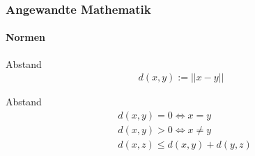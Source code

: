 \documentclass{beamer}
\begin{document}
\begin{frame}
    \frametitle{Angewandte Mathematik}
\framesubtitle{Normen}
 \begin{block}{Abstand}
\begin{align*}
d(x,y) := ||x-y||
\end{align*}
\end{block}
 \begin{block}{Abstand}
\begin{align*}
& d(x,y)  = 0 \Leftrightarrow x = y \\
& d(x,y)  > 0 \Leftrightarrow x \neq y \\
& d(x,z)  \leq  d(x,y) + d(y,z) 
\end{align*}
\end{block}
 \end{frame}
\end{document}
